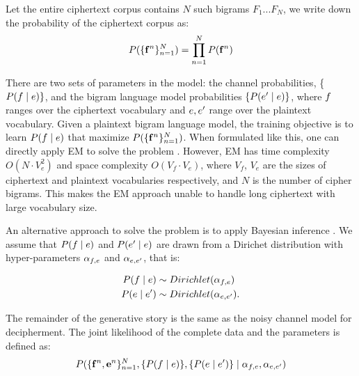 Let the entire ciphertext corpus contains $N$ such bigrams $F_{1}...F_{N}$, we write down the probability of the ciphertext corpus as:
%
\[
\label{p_corpus}
P( \{ \mathbf{f}^n \}_{n=1}^{N} ) =  \prod_{n=1}^{N} P(\mathbf{f}^{n})
\]
%

There are two sets of parameters in the model: the channel probabilities, \{ $P(f \mid e) \} $, and the bigram language model probabilities $\{ P(e' \mid e) \} $, where $f$ ranges over the ciphertext vocabulary and $e,e'$ range over the plaintext vocabulary. Given a plaintext bigram language model, the training objective is to learn $P(f \mid e)$ that maximize $P( \{ \mathbf{f}^n \}_{n=1}^{N} )$. When formulated like this, one can directly apply EM to solve the problem \cite{knight-EtAl:2006}. However, EM has time complexity $O( N\cdot V_{e}^{2})$ and space complexity $O(V_{f}\cdot V_{e})$, where $V_{f}$, $V_{e}$ are the sizes of ciphertext and plaintext vocabularies respectively, and $N$ is the number of cipher bigrams. This makes the EM approach unable to handle long ciphertext with large vocabulary size. 

An alternative approach to solve the problem is to apply Bayesian inference \cite{ravi-knight:2011,Dou:2012}. We assume that $P(f \mid e)$ and $P(e' \mid e)$ are drawn from a Dirichet distribution with hyper-parameters $\alpha_{f,e}$ and $\alpha_{e,e'}$, that is: 

\begin{align*}
P(f \mid e) & \sim Dirichlet(\alpha_{f,e}) \\ 
P(e \mid e') & \sim Dirichlet(\alpha_{e,e'}).
\end{align*}

The remainder of the generative story is the same as the noisy channel model for decipherment. The joint likelihood of the complete data and the parameters is defined as:
\begin{equation}
P( \{ \mathbf{f}^n , \mathbf{e}^n \}_{n=1}^{N}, \{ P(f \mid e) \}, \{ P(e \mid e') \} \mid \alpha_{f,e}, \alpha_{e,e'} )
\end{equation}

